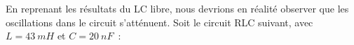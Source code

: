 \documentclass[../../main/main.tex]{subfiles}
\begin{document}
\begin{minipage}{0.60\linewidth}
	En reprenant les résultats du LC libre, nous devrions en réalité observer que
	les oscillations dans le circuit s'atténuent. Soit le circuit RLC
	suivant, avec $L = \SI{43}{mH}$ et $C
		= \SI{20}{nF}$~:
\end{minipage}
\begin{minipage}{0.40\linewidth}
	\begin{center}
	\end{center}
\end{minipage}
\end{document}
